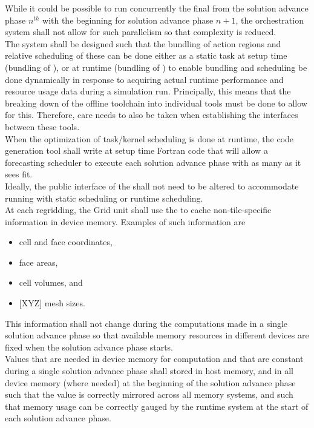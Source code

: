 \documentclass{article}
\begin{document}
While it could be possible to run concurrently the final \taskroutines from the
solution advance phase $n^{th}$
with the beginning \taskroutines for solution advance phase $n+1$, the orchestration
system shall not allow for such parallelism so that complexity is reduced.\\

The system shall be designed such that the bundling of action regions and relative
scheduling of these can be done either as a static task at setup time (bundling of \OLARs), or at
runtime (bundling of \actionroutines) to enable bundling and scheduling be done dynamically in response to
acquiring actual runtime performance and resource usage data during a simulation
run.  Principally, this means that the breaking down of the offline toolchain into
individual tools must be done to allow for this.
Therefore, care needs to also be taken when establishing the interfaces between
these tools.  \\

When the optimization of task/kernel scheduling is done at runtime, the
code generation tool shall write at setup time Fortran code that will allow a
forecasting scheduler to execute each solution advance phase with as many \actionroutinebundles as it
sees fit.\\

Ideally, the public interface of the \OR shall not need to be
altered to accommodate running with static scheduling or runtime scheduling.\\

At each regridding, the Grid unit shall use the \OR to cache
non-tile-specific information in device memory.  Examples of such information
are
\begin{itemize}
\item{cell and face coordinates,}
\item{face areas, }
\item{cell volumes, and}
\item{[XYZ] mesh sizes.}
\end{itemize}
This information shall not change during the computations made in a single solution
advance phase so that available memory resources in different devices are fixed when the
solution advance phase starts.\\

Values that are needed in device memory for computation and that are constant
during a single solution advance phase shall stored in host memory, and in all device memory
(where needed) at the beginning of the solution advance phase such that the value is
correctly mirrored across all memory systems, and such that memory usage can be
correctly gauged by the runtime system at the start of each solution advance phase.
\end{document}
